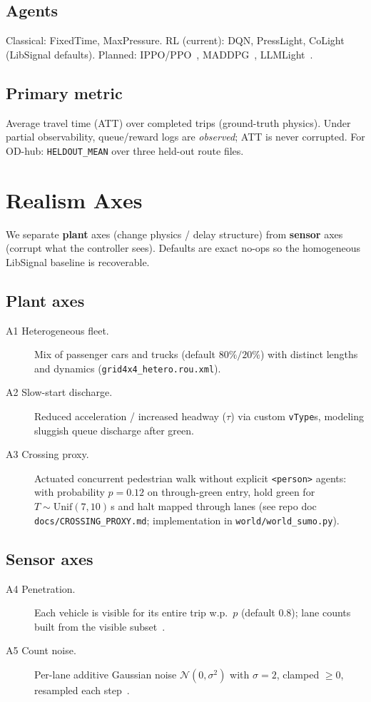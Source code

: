 \documentclass[11pt,a4paper]{article}
\newcommand{\att}{ATT}
\begin{document}
\subsection{Agents}
Classical: FixedTime, MaxPressure.
RL (current): DQN, PressLight, CoLight (LibSignal defaults).
Planned: IPPO/PPO~\citep{schulman2017ppo}, MADDPG~\citep{lowe2017maddpg}, LLMLight~\citep{lai2024llmlight}.

\subsection{Primary metric}
Average travel time (\att) over completed trips (ground-truth physics).
Under partial observability, queue/reward logs are \emph{observed}; ATT is never corrupted.
For OD-hub: \texttt{HELDOUT\_MEAN} over three held-out route files.

\section{Realism Axes}
\label{sec:axes}

We separate \textbf{plant} axes (change physics / delay structure) from \textbf{sensor} axes (corrupt what the controller sees).
Defaults are exact no-ops so the homogeneous LibSignal baseline is recoverable.

\subsection{Plant axes}
\begin{description}
  \item[A1 Heterogeneous fleet.]
    Mix of passenger cars and trucks (default $80\%/20\%$) with distinct lengths and dynamics (\texttt{grid4x4\_hetero.rou.xml}).
  \item[A2 Slow-start discharge.]
    Reduced acceleration / increased headway ($\tau$) via custom \texttt{vType}s, modeling sluggish queue discharge after green.
  \item[A3 Crossing proxy.]
    Actuated concurrent pedestrian walk without explicit \texttt{<person>} agents: with probability $p{=}0.12$ on through-green entry, hold green for $T\sim\mathrm{Unif}(7,10)$\,s and halt mapped through lanes (see repo doc \texttt{docs/CROSSING\_PROXY.md}; implementation in \texttt{world/world\_sumo.py}).
\end{description}

\subsection{Sensor axes}
\begin{description}
  \item[A4 Penetration.]
    Each vehicle is visible for its entire trip w.p.\ $p$ (default $0.8$); lane counts built from the visible subset~\citep{chen2022realdeal}.
  \item[A5 Count noise.]
    Per-lane additive Gaussian noise $\mathcal{N}(0,\sigma^2)$ with $\sigma{=}2$, clamped $\ge 0$, resampled each step~\citep{tan2020robust}.
\end{description}
\end{document}

